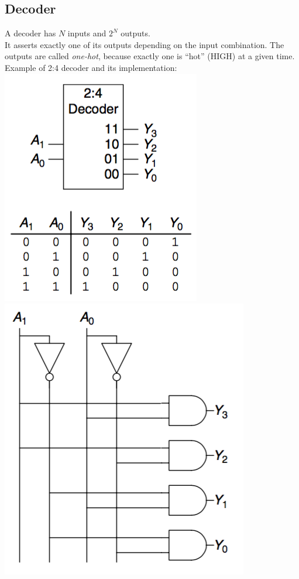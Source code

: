 \documentclass[12pt]{article}
\theoremstyle{definition}
\begin{document}
  \newpage
  \subsection{Decoder}
  A decoder has $N$ inputs and $2^{N}$ outputs. \\
  It asserts exactly one of its outputs depending on the input combination.
  The outputs are called \emph{one-hot}, because exactly one is ``hot'' (HIGH) at a given time. \\

  Example of 2:4 decoder and its implementation: \\
  \includegraphics{pictures/2_4_decoder.png}
  \includegraphics{pictures/2_4_decoder_implementation.png} \\
\end{document}
